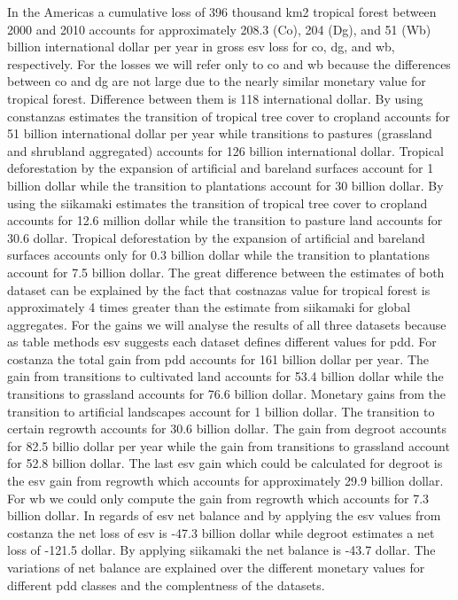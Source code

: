		 In the Americas a cumulative loss of 396 thousand km2 tropical forest between 2000 and 2010 accounts for approximately 208.3 (Co), 204 (Dg), and 51 (Wb) billion international dollar per year in gross esv loss for co, dg, and wb, respectively. For the losses we will refer only to co and wb because the differences between co and dg are not large due to the nearly similar monetary value for tropical forest. Difference between them is 118 international dollar. By using constanzas estimates the transition of tropical tree cover to cropland accounts for 51 billion international dollar per year while transitions to pastures (grassland and shrubland aggregated) accounts for 126 billion international dollar. Tropical deforestation by the expansion of artificial and bareland surfaces account for 1 billion dollar while the transition to plantations account for 30 billion dollar. By using the siikamaki estimates the transition of tropical tree cover to cropland accounts for 12.6 million dollar while the transition to pasture land accounts for 30.6 dollar. Tropical deforestation  by the expansion of artificial and bareland surfaces accounts only for 0.3 billion dollar while the transition to plantations account for 7.5 billion dollar. The great difference between the estimates of both dataset can be explained by the fact that costnazas value for tropical forest is approximately 4 times greater than the estimate from siikamaki for global aggregates. For the gains we will analyse the results of all three datasets because as table methods esv suggests each dataset defines different values for pdd. For costanza the total gain from pdd accounts for 161 billion dollar per year. The gain from transitions to cultivated land accounts for 53.4 billion dollar while the transitions to grassland accounts for 76.6 billion dollar. Monetary gains from the transition to artificial landscapes account for 1 billion dollar. The transition to certain regrowth accounts for 30.6 billion dollar. The gain from degroot accounts for 82.5 billio dollar per year while the gain from transitions to grassland account for 52.8 billion dollar. The last esv gain which could be calculated for degroot is the esv gain from regrowth which accounts for approximately 29.9 billion dollar. For wb we could only compute the gain from regrowth which accounts for 7.3 billion dollar. In regards of esv net balance and by applying the esv values from costanza the net loss of esv is -47.3 billion dollar while degroot estimates a net loss of -121.5 dollar. By applying siikamaki the net balance is -43.7 dollar. The variations of net balance are explained over the different monetary values for different pdd classes and the complentness of the datasets.

